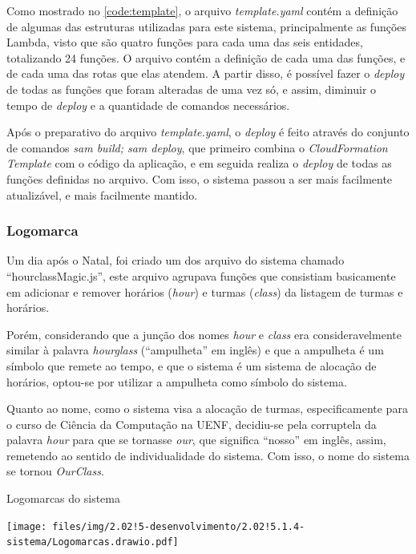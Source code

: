 

Como mostrado no \autoref{code:template}, o arquivo \textit{template.yaml} contém a definição de algumas das estruturas utilizadas para este sistema, principalmente as funções Lambda, visto que são quatro funções para cada uma das seis entidades, totalizando 24 funções. O arquivo contém a definição de cada uma das funções, e de cada uma das rotas que elas atendem. A partir disso, é possível fazer o \textit{deploy} de todas as funções que foram alteradas de uma vez só, e assim, diminuir o tempo de \textit{deploy} e a quantidade de comandos necessários.

Após o preparativo do arquivo \textit{template.yaml}, o \textit{deploy} é feito através do conjunto de comandos \textit{sam build; sam deploy}, que primeiro combina o \textit{CloudFormation Template} com o código da aplicação, e em seguida realiza o \textit{deploy} de todas as funções definidas no arquivo. Com isso, o sistema passou a ser mais facilmente atualizável, e mais facilmente mantido.

\subsubsection{Logomarca}

Um dia após o Natal, foi criado um dos arquivo do sistema chamado ``hourclassMagic.js'', este arquivo agrupava funções que consistiam basicamente em adicionar e remover horários (\textit{hour}) e turmas (\textit{class}) da listagem de turmas e horários.

Porém, considerando que a junção dos nomes \textit{hour} e \textit{class} era consideravelmente similar à palavra \textit{hourglass} (``ampulheta'' em inglês) e que a ampulheta é um símbolo que remete ao tempo, e que o sistema é um sistema de alocação de horários, optou-se por utilizar a ampulheta como símbolo do sistema.

Quanto ao nome, como o sistema visa a alocação de turmas, especificamente para o curso de Ciência da Computação na UENF, decidiu-se pela corruptela da palavra \textit{hour} para que se tornasse \textit{our}, que significa ``nosso'' em inglês, assim, remetendo ao sentido de individualidade do sistema. Com isso, o nome do sistema se tornou \textit{OurClass}.

\begin{MyCenteredFigure}
  \caption{Logomarcas do sistema}
  \label{fig:Logomarcas}
  \texttt{[image: files/img/2.02!5-desenvolvimento/2.02!5.1.4-sistema/Logomarcas.drawio.pdf]}
\end{MyCenteredFigure}

